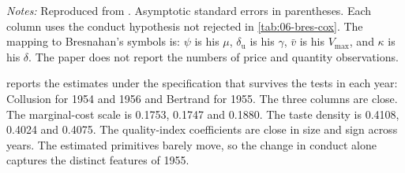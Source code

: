 \begin{table}[t]
\smallskip
\begin{minipage}{0.86\textwidth}
\footnotesize
\emph{Notes:} Reproduced from \citet[Table IV, p.~472]{Bresnahan1987}. Asymptotic standard errors in parentheses.
Each column uses the conduct hypothesis not rejected in \cref{tab:06-bres-cox}. The mapping to Bresnahan's symbols
is: $\psi$ is his $\mu$, $\delta_{\mathrm u}$ is his $\gamma$, $\bar v$ is his $V_{\max}$, and $\kappa$ is his
$\delta$. The paper does not report the numbers of price and quantity observations.
\end{minipage}
\end{table}

 reports the estimates under the specification that survives the tests in each year: Collusion
for 1954 and 1956 and Bertrand for 1955. The three columns are close. The marginal-cost scale is
0.1753, 0.1747 and 0.1880. The taste density is 0.4108, 0.4024 and 0.4075. The quality-index coefficients are close
in size and sign across years. The estimated primitives barely move, so the change in conduct alone captures the distinct
features of 1955.

